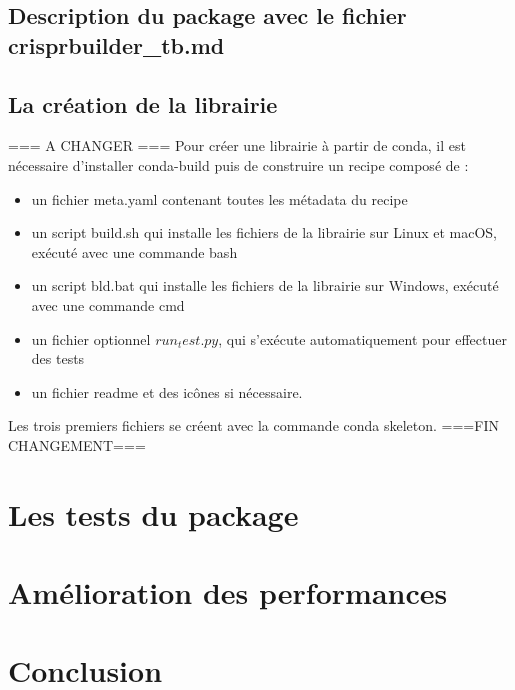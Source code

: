 \documentclass[twoside,a4paper,11pt,frenchb,openany]{report}
\begin{document}
\section{Description du package avec le fichier crisprbuilder\_tb.md}




\section{La création de la librairie}

=== A CHANGER ===
Pour créer une librairie à partir de conda, il est nécessaire d'installer conda-build puis de construire un recipe composé de :
\begin{itemize}
\item un fichier meta.yaml contenant toutes les métadata du recipe
\item un script build.sh qui installe les fichiers de la librairie sur Linux et macOS, exécuté avec une commande bash
\item un script bld.bat qui installe les fichiers de la librairie sur Windows, exécuté avec une commande cmd
\item un fichier optionnel $run_test.py$, qui s'exécute automatiquement pour effectuer des tests
\item un fichier readme et des icônes si nécessaire.  
\end{itemize}
Les trois premiers fichiers se créent avec la commande conda skeleton.
===FIN CHANGEMENT===



\chapter{Les tests du package}





\chapter{Amélioration des performances}


\chapter*{Conclusion}
\end{document}
